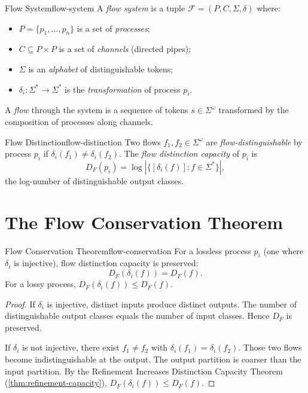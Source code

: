 \documentclass[12pt,twoside,openright]{book}
\begin{document}
\begin{definition}{Flow System}{flow-system}
  A \emph{flow system} is a tuple
  $\mathcal{F} = (P, C, \Sigma, \delta)$ where:
  \begin{itemize}[nosep]
    \item $P = \{p_1, \ldots, p_n\}$ is a set of
          \emph{processes};
    \item $C \subseteq P \times P$ is a set of
          \emph{channels} (directed pipes);
    \item $\Sigma$ is an \emph{alphabet} of distinguishable
          tokens;
    \item $\delta_i : \Sigma^* \to \Sigma^*$ is the
          \emph{transformation} of process $p_i$.
  \end{itemize}
  A \emph{flow} through the system is a sequence of tokens
  $s \in \Sigma^\omega$ transformed by the composition of
  processes along channels.
\end{definition}

\begin{definition}{Flow Distinction}{flow-distinction}
  Two flows $f_1, f_2 \in \Sigma^\omega$ are
  \emph{flow-distinguishable} by process $p_i$ if
  $\delta_i(f_1) \ne \delta_i(f_2)$.
  The \emph{flow distinction capacity} of $p_i$ is
  \[
    D_F(p_i) = \log|\{[\delta_i(f)] : f \in \Sigma^*\}|,
  \]
  the log-number of distinguishable output classes.
\end{definition}

\section{The Flow Conservation Theorem}

\begin{theorem}{Flow Conservation Theorem}{flow-conservation}
  For a lossless process $p_i$ (one where $\delta_i$ is
  injective), flow distinction capacity is preserved:
  \[
    D_F(\delta_i(f)) = D_F(f).
  \]
  For a lossy process, $D_F(\delta_i(f)) \le D_F(f)$.
\end{theorem}

\begin{proof}
  If $\delta_i$ is injective, distinct inputs produce
  distinct outputs. The number of distinguishable output
  classes equals the number of input classes.
  Hence $D_F$ is preserved.

  If $\delta_i$ is not injective, there exist
  $f_1 \ne f_2$ with $\delta_i(f_1) = \delta_i(f_2)$.
  Those two flows become indistinguishable at the output.
  The output partition is coarser than the input partition.
  By the Refinement Increases Distinction Capacity Theorem
  (\cref{thm:refinement-capacity}),
  $D_F(\delta_i(f)) \le D_F(f)$.
\end{proof}
\end{document}
